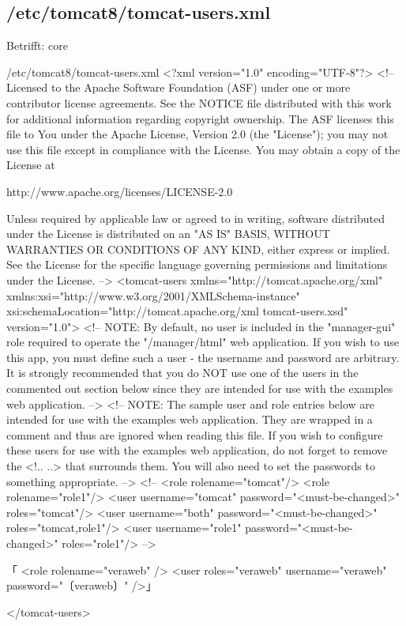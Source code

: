 \documentclass{tarentanleitung}
\begin{document}
\subsection{/etc/tomcat8/tomcat-users.xml}\label{subsec:refcfg-tc-users}

Betrifft: core

\begin{lstdump}{/etc/tomcat8/tomcat-users.xml}
<?xml version="1.0" encoding="UTF-8"?>
<!--
  Licensed to the Apache Software Foundation (ASF) under one or more
  contributor license agreements.  See the NOTICE file distributed with
  this work for additional information regarding copyright ownership.
  The ASF licenses this file to You under the Apache License, Version 2.0
  (the "License"); you may not use this file except in compliance with
  the License.  You may obtain a copy of the License at

      http://www.apache.org/licenses/LICENSE-2.0

  Unless required by applicable law or agreed to in writing, software
  distributed under the License is distributed on an "AS IS" BASIS,
  WITHOUT WARRANTIES OR CONDITIONS OF ANY KIND, either express or implied.
  See the License for the specific language governing permissions and
  limitations under the License.
-->
<tomcat-users xmlns="http://tomcat.apache.org/xml"
              xmlns:xsi="http://www.w3.org/2001/XMLSchema-instance"
              xsi:schemaLocation="http://tomcat.apache.org/xml tomcat-users.xsd"
              version="1.0">
<!--
  NOTE:  By default, no user is included in the "manager-gui" role required
  to operate the "/manager/html" web application.  If you wish to use this app,
  you must define such a user - the username and password are arbitrary. It is
  strongly recommended that you do NOT use one of the users in the commented out
  section below since they are intended for use with the examples web
  application.
-->
<!--
  NOTE:  The sample user and role entries below are intended for use with the
  examples web application. They are wrapped in a comment and thus are ignored
  when reading this file. If you wish to configure these users for use with the
  examples web application, do not forget to remove the <!.. ..> that surrounds
  them. You will also need to set the passwords to something appropriate.
-->
<!--
  <role rolename="tomcat"/>
  <role rolename="role1"/>
  <user username="tomcat" password="<must-be-changed>" roles="tomcat"/>
  <user username="both" password="<must-be-changed>" roles="tomcat,role1"/>
  <user username="role1" password="<must-be-changed>" roles="role1"/>
-->

「  <role rolename="veraweb" />
  <user roles="veraweb" username="veraweb" password="〔veraweb〕" />」

</tomcat-users>
\end{lstdump}
\end{document}
